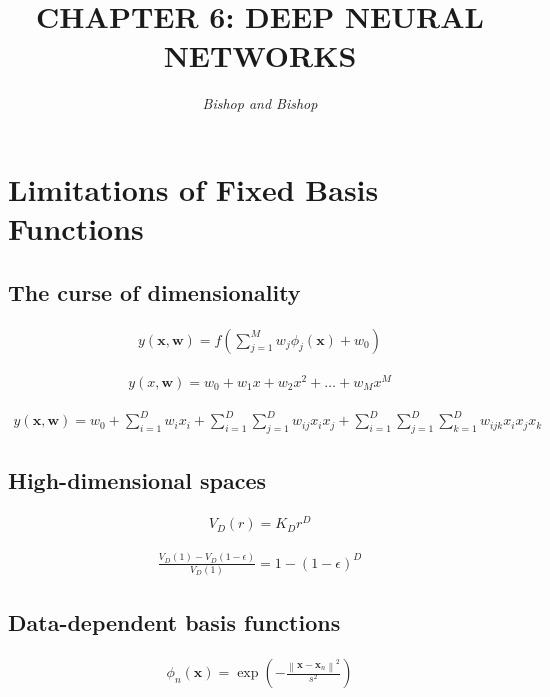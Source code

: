\documentclass{article}
\title{\LARGE\scshape\MakeUppercase{Chapter 6: Deep Neural Networks}}
\author{\textit{Bishop and Bishop}}
\date{}  %
\begin{document}
\maketitle

\section{Limitations of Fixed Basis Functions}

\subsection{The curse of dimensionality}

\begin{align*}
y(\mathbf{x}, \mathbf{w})=f\left(\sum_{j=1}^{M} w_{j} \phi_{j}(\mathbf{x})+w_{0}\right) 
\tag{6.1}
\end{align*}

\begin{align*}
y(x, \mathbf{w})=w_{0}+w_{1} x+w_{2} x^{2}+\ldots+w_{M} x^{M} 
\tag{6.2}
\end{align*}

\begin{align*}
y(\mathbf{x}, \mathbf{w})=w_{0}+\sum_{i=1}^{D} w_{i} x_{i}+\sum_{i=1}^{D} \sum_{j=1}^{D} w_{i j} x_{i} x_{j}+\sum_{i=1}^{D} \sum_{j=1}^{D} \sum_{k=1}^{D} w_{i j k} x_{i} x_{j} x_{k} 
\tag{6.3}
\end{align*}

\subsection{High-dimensional spaces}

\begin{align*}
V_{D}(r)=K_{D} r^{D} 
\tag{6.4}
\end{align*}

\begin{align*}
\frac{V_{D}(1)-V_{D}(1-\epsilon)}{V_{D}(1)}=1-(1-\epsilon)^{D} 
\tag{6.5}
\end{align*}

\subsection{Data-dependent basis functions}

\begin{align*}
\phi_{n}(\mathbf{x})=\exp \left(-\frac{\left\|\mathbf{x}-\mathbf{x}_{n}\right\|^{2}}{s^{2}}\right) 
\tag{6.6}
\end{align*}
\end{document}
